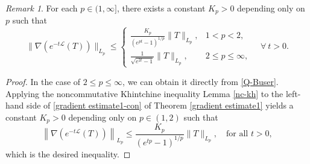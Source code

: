 \documentclass{amsbook}
\theoremstyle{definition}
\theoremstyle{remark}
\newtheorem{remark}[theorem]{Remark}
\numberwithin{section}{chapter}
\numberwithin{equation}{chapter}
\newcommand{\M}{\mathbb{M}}
\newcommand{\1}{\mathbf{1}}
\newcommand{\dc}{\mathbf{d}}
\begin{document}

\begin{remark}\label{gradient estimate 2}
For each $p\in(1,\infty]$, there exists a constant $K_{p}>0$ depending only on $p$ such that
\begin{equation}
\|\nabla(e^{-t\mathcal{L}}(T))\|_{L_{p}}\leq \begin{cases} 
\frac{K_{p}}{(e^{pt}-1)^{1/p}}\|T\|_{L_{p}}, & 1<p<2, \\ 
\frac{1}{\sqrt{e^{2t}-1}}\|T\|_{L_{p}}, & {2\leq p\leq\infty,}
\end{cases}\quad\forall~t>0.
\end{equation}
\end{remark}
\begin{proof}
In the case of $2\leq p\leq\infty$, we can obtain it directly from  \eqref{Q-Buser}. Applying the noncommutative Khintchine inequality Lemma \ref{nc-kh} to the left-hand side of \eqref{gradient estimate1-con} of Theorem \ref{gradient estimate1} yields a constant $K_{p}>0$ depending only on $p\in(1,2)$ such that
\[
\left\|\nabla(e^{-t\mathcal{L}}(T))\right\|_{L_{p}}\leq\frac{K_{p}}{(e^{tp}-1)^{1/p}}\|T\|_{L_{p}},\quad\mbox{for all }t>0,
\]
which is the desired inequality.
\end{proof}
\end{document}
